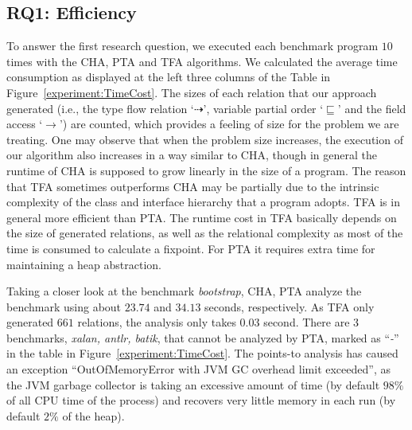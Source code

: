 \documentclass{llncs}
\newcommand{\less}{\sqsubseteq}
\newcommand{\tflow}{\dashrightarrow}
\begin{document}
\subsection{RQ1: Efficiency}\label{subsec:efficiency}
To answer the first research question, we executed each benchmark program $10$ times with the CHA, PTA and TFA algorithms. We calculated the average time consumption as displayed at the left three columns of the Table in Figure~\ref{experiment:TimeCost}. The sizes of each relation that our approach generated (i.e., the type flow relation `$\tflow$', variable partial order `$\less$' and the field access `$\rightarrow$') are counted, which provides a feeling of size for the problem we are treating. One may observe that when the problem size increases, the execution of our algorithm also increases in a way similar to CHA, though in general the runtime of CHA is supposed to grow linearly in the size of a program. The reason that TFA sometimes outperforms CHA may be partially due to the intrinsic complexity of the class and interface hierarchy that a program adopts. TFA is in general more efficient than PTA.
The runtime cost in TFA basically depends on the size of generated relations, as well as the relational complexity as most of the time is consumed to calculate a fixpoint. For PTA it requires extra time for maintaining a heap abstraction.

Taking a closer look at the benchmark \textit{bootstrap}, CHA, PTA analyze the benchmark using about $23.74$ and $34.13$ seconds, respectively. As TFA only generated $661$ relations, the analysis only takes $0.03$ second.
There are 3 benchmarks, \textit{xalan, antlr, batik}, that cannot be analyzed by PTA, marked as ``\emph{-}'' in the table in Figure~\ref{experiment:TimeCost}. The points-to analysis has caused an exception ``OutOfMemoryError with JVM GC overhead limit exceeded'', as the JVM garbage collector is taking an excessive amount of time (by default $98\%$ of all CPU time of the process) and recovers very little memory in each run (by default $2\%$ of the heap).
\end{document}
